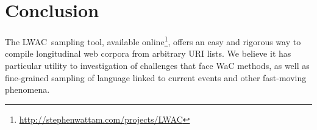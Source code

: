 \documentclass[11pt]{article}
\newcommand{\toolname}{LWAC}
\begin{document}


\section{Conclusion}
The \toolname~sampling tool, available online\footnote{\url{http://stephenwattam.com/projects/LWAC}}, offers an easy and rigorous way to compile longitudinal web corpora from arbitrary URI lists.  We believe it has particular utility to investigation of challenges that face WaC methods, as well as fine-grained sampling of language linked to current events and other fast-moving phenomena.





\end{document}

